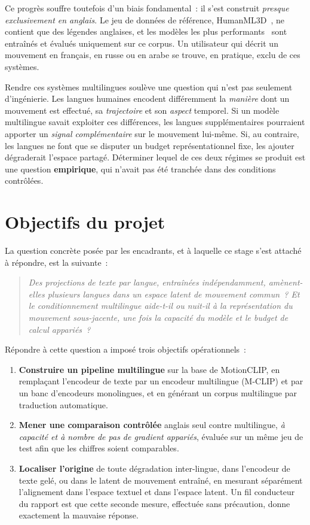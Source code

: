 \documentclass[12pt,a4paper,oneside]{report}
\theoremstyle{definition}
\theoremstyle{plain}
\begin{document}
Ce progrès souffre toutefois d'un biais fondamental~: il s'est construit
\emph{presque exclusivement en anglais}. Le jeu de données de référence,
HumanML3D~\cite{guo2022humanml3d}, ne contient que des légendes anglaises, et
les modèles les plus performants~\cite{tevet2023mdm,guo2024momask} sont
entraînés et évalués uniquement sur ce corpus. Un utilisateur qui décrit un
mouvement en français, en russe ou en arabe se trouve, en pratique, exclu de ces
systèmes.

Rendre ces systèmes multilingues soulève une question qui n'est pas seulement
d'ingénierie. Les langues humaines encodent différemment la \emph{manière} dont
un mouvement est effectué, sa \emph{trajectoire} et son \emph{aspect} temporel.
Si un modèle multilingue savait exploiter ces différences, les langues
supplémentaires pourraient apporter un \emph{signal complémentaire} sur le
mouvement lui-même. Si, au contraire, les langues ne font que se disputer un
budget représentationnel fixe, les ajouter dégraderait l'espace partagé.
Déterminer lequel de ces deux régimes se produit est une question
\textbf{empirique}, qui n'avait pas été tranchée dans des conditions contrôlées.

\section*{Objectifs du projet}

La question concrète posée par les encadrants, et à laquelle ce stage s'est
attaché à répondre, est la suivante~:

\begin{quote}
\itshape Des projections de texte par langue, entraînées indépendamment,
amènent-elles plusieurs langues dans un espace latent de mouvement commun~? Et
le conditionnement multilingue aide-t-il ou nuit-il à la représentation du
mouvement sous-jacente, une fois la capacité du modèle et le budget de calcul
appariés~?
\end{quote}

\noindent Répondre à cette question a imposé trois objectifs opérationnels~:

\begin{enumerate}[leftmargin=*]
\item \textbf{Construire un pipeline multilingue} sur la base de MotionCLIP, en
remplaçant l'encodeur de texte par un encodeur multilingue (M-CLIP) et par un
banc d'encodeurs monolingues, et en générant un corpus multilingue par
traduction automatique.
\item \textbf{Mener une comparaison contrôlée} anglais seul contre multilingue,
\emph{à capacité et à nombre de pas de gradient appariés}, évaluée sur un même
jeu de test afin que les chiffres soient comparables.
\item \textbf{Localiser l'origine} de toute dégradation inter-lingue, dans
l'encodeur de texte gelé, ou dans le latent de mouvement entraîné, en
mesurant séparément l'alignement dans l'espace textuel et dans l'espace latent.
Un fil conducteur du rapport est que cette seconde mesure, effectuée sans
précaution, donne exactement la mauvaise réponse.
\end{enumerate}
\end{document}

